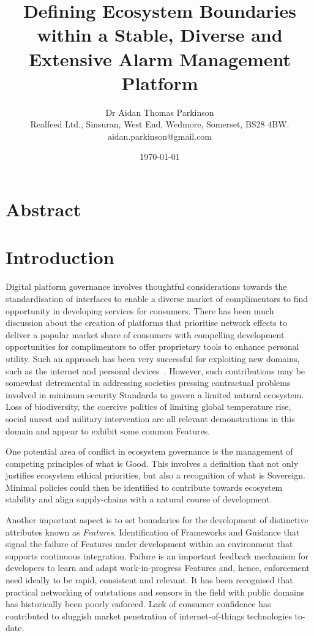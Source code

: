 \documentclass[11pt, oneside]{article}   	%
\title{Defining Ecosystem Boundaries within a Stable, Diverse and Extensive Alarm Management Platform}
\author{Dr Aidan Thomas Parkinson\\ Realfeed Ltd., Sinsuran, West End, Wedmore, Somerset, BS28 4BW.\\ aidan.parkinson@gmail.com}
\date{\today}							%
\begin{document}
\maketitle

\section*{Abstract}

\pagebreak

\section{Introduction}
Digital platform governance involves thoughtful considerations towards the standardisation of interfaces to enable a diverse market of complimentors to find opportunity in developing services for consumers.
There has been much discussion about the creation of platforms that prioritise network effects to deliver a popular market share of consumers with compelling development opportunities for complimentors to offer proprietary tools to enhance personal utility.
Such an approach has been very successful for exploiting new domains, such as the internet and personal devices~\cite{bop1}.
However, such contributions may be somewhat detremental in addressing societies pressing contractual problems involved in minimum security Standards to govern a limited natural ecosystem.
Loss of biodiversity, the coercive politics of limiting global temperature rise, social unrest and military intervention are all relevant demonstrations in this domain and appear to exhibit some common Features.\

One potential area of conflict in ecosystem governance is the management of competing principles of what is Good.
This involves a definition that not only justifies ecosystem ethical priorities, but also a recognition of what is Sovereign.
Minimal policies could then be identified to contribute towards ecosystem stability and align supply-chains with a natural course of development.\

Another important aspect is to set boundaries for the development of distinctive attributes known as \emph{Features}.
Identification of Frameworks and Guidance that signal the failure of Features under development within an environment that supports continuous integration.
Failure is an important feedback mechanism for developers to learn and adapt work-in-progress Features and, hence, enforcement need ideally to be rapid, consistent and relevant.
It has been recognised that practical networking of outstations and sensors in the field with public domains has historically been poorly enforced.
Lack of consumer confidence has contributed to sluggish market penetration of internet-of-things technologies to-date.\
\end{document}
